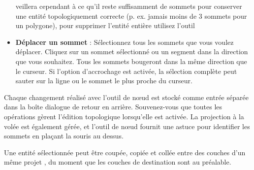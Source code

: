 \begin{itemize}[label=--]
\qg veillera cependant à ce qu'il reste suffisamment de sommets pour conserver 
une entité topologiquement correcte (p. ex. jamais moins de 3 sommets pour un 
polygone), pour supprimer l'entité entière utilisez l'outil 
\item \textbf{Déplacer un sommet} : Sélectionnez tous les sommets que vous voulez 
déplacer. Cliquez sur un sommet sélectionné ou un segment dans la direction que 
vous souhaitez. Tous les sommets bougeront dans la même direction que le curseur. 
Si l'option d'accrochage est activée, la sélection complète peut sauter sur la 
ligne ou le sommet le plus proche du curseur.
\end{itemize}

Chaque changement réalisé avec l'outil de nœud est stocké comme entrée séparée 
dans la boîte dialogue de retour en arrière. Souvenez-vous que toutes les 
opérations gèrent l'édition topologique lorsqu'elle est activée. La projection à la 
volée est également gérée, et l'outil de nœud fournit une astuce pour identifier 
les sommets en plaçant la souris au dessus.



Une entité sélectionnée peut être coupée, copiée et collée entre des couches d'un 
même projet \qg, du moment que les couches de destination sont 
 au préalable.


